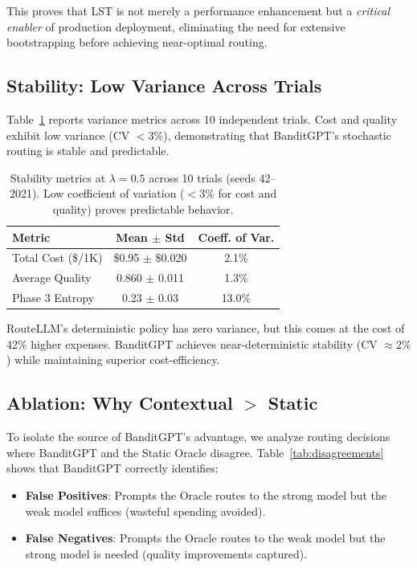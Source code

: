 This proves that LST is not merely a performance enhancement but a \emph{critical enabler} of production deployment, eliminating the need for extensive bootstrapping before achieving near-optimal routing.

\subsection{Stability: Low Variance Across Trials}

Table~\ref{tab:stability} reports variance metrics across 10 independent trials. Cost and quality exhibit low variance (CV $< 3\%$), demonstrating that BanditGPT's stochastic routing is stable and predictable.

\begin{table}[h]
\centering
\small
\begin{tabular}{@{}lcc@{}}
\toprule
\textbf{Metric} & \textbf{Mean $\pm$ Std} & \textbf{Coeff. of Var.} \\ \midrule
Total Cost (\$/1K) & \$0.95 $\pm$ \$0.020 & 2.1\% \\
Average Quality & 0.860 $\pm$ 0.011 & 1.3\% \\
Phase 3 Entropy & 0.23 $\pm$ 0.03 & 13.0\% \\
\bottomrule
\end{tabular}
\caption{%
    Stability metrics at $\lambda=0.5$ across 10 trials (seeds 42--2021). 
    Low coefficient of variation ($<3\%$ for cost and quality) proves predictable behavior.
}
\label{tab:stability}
\end{table}

RouteLLM's deterministic policy has zero variance, but this comes at the cost of 42\% higher expenses. BanditGPT achieves near-deterministic stability (CV $\approx 2\%$) while maintaining superior cost-efficiency.

\subsection{Ablation: Why Contextual $>$ Static}

To isolate the source of BanditGPT's advantage, we analyze routing decisions where BanditGPT and the Static Oracle disagree. Table~\ref{tab:disagreements} shows that BanditGPT correctly identifies:

\begin{itemize}
    \item \textbf{False Positives}: Prompts the Oracle routes to the strong model but the weak model suffices (wasteful spending avoided).
    \item \textbf{False Negatives}: Prompts the Oracle routes to the weak model but the strong model is needed (quality improvements captured).
\end{itemize}

